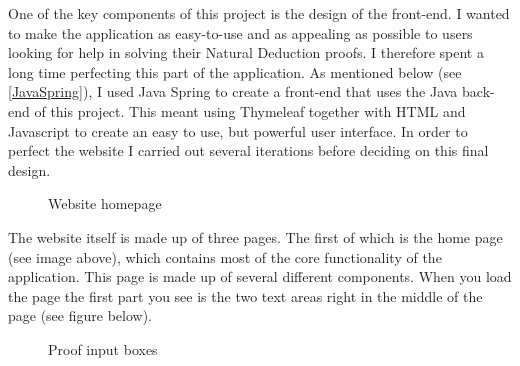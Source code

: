 One of the key components of this project is the design of the front-end. I wanted to make the application as easy-to-use and as appealing as possible to users looking for help in solving their Natural Deduction proofs. I therefore spent a long time perfecting this part of the application. As mentioned below (see \ref{JavaSpring}), I used Java Spring to create a front-end that uses the Java back-end of this project. This meant using Thymeleaf together with HTML and Javascript to create an easy to use, but powerful user interface. In order to perfect the website I carried out several iterations before deciding on this final design.

\begin{figure}[!ht]
	\centering
	\caption{Website homepage}
\end{figure}

The website itself is made up of three pages. The first of which is the home page (see image above), which contains most of the core functionality of the application. This page is made up of several different components. When you load the page the first part you see is the two text areas right in the middle of the page (see figure below). 

\begin{figure}[!ht]
	\centering
	\caption{Proof input boxes}
\end{figure}


